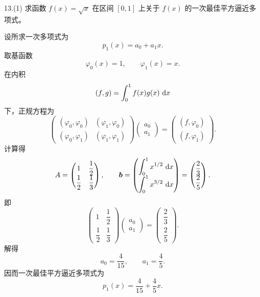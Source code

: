 \documentclass[11pt, a4paper]{ctexart}
\begin{document}
\begin{problem}{13.(1) 求函数 $f(x)=\sqrt{x}$ 在区间 $[0,1]$ 上关于 $f(x)$ 的一次最佳平方逼近多项式。}
\end{problem}

\begin{solution}
    设所求一次多项式为
    \[
        p_1(x)=a_0+a_1x.
    \]
    取基函数
    \[
        \varphi_0(x)=1,\qquad \varphi_1(x)=x.
    \]
    在内积
    \[
        (f,g)=\int_{0}^{1}f(x)g(x)\,\,\mathrm{d} x
    \]
    下，正规方程为
    \[
        \begin{pmatrix}
            (\varphi_0,\varphi_0) & (\varphi_1,\varphi_0) \\
            (\varphi_0,\varphi_1) & (\varphi_1,\varphi_1)
        \end{pmatrix}
        \begin{pmatrix}
            a_0 \\
            a_1
        \end{pmatrix}
        =
        \begin{pmatrix}
            (f,\varphi_0) \\
            (f,\varphi_1)
        \end{pmatrix}.
    \]
    计算得
    \[
        A=
        \begin{pmatrix}
            1 & \dfrac{1}{2} \\
            \dfrac{1}{2} & \dfrac{1}{3}
        \end{pmatrix},
        \qquad
        \bm b=
        \begin{pmatrix}
            \displaystyle\int_{0}^{1}x^{1/2}\,\,\mathrm{d} x \\
            \displaystyle\int_{0}^{1}x^{3/2}\,\,\mathrm{d} x
        \end{pmatrix}
        =
        \begin{pmatrix}
            \dfrac{2}{3} \\
            \dfrac{2}{5}
        \end{pmatrix}.
    \]
    即
    \[
        \begin{pmatrix}
            1 & \dfrac{1}{2} \\
            \dfrac{1}{2} & \dfrac{1}{3}
        \end{pmatrix}
        \begin{pmatrix}
            a_0 \\
            a_1
        \end{pmatrix}
        =
        \begin{pmatrix}
            \dfrac{2}{3} \\
            \dfrac{2}{5}
        \end{pmatrix}.
    \]
    解得
    \[
        a_0=\frac{4}{15},\qquad a_1=\frac{4}{5}.
    \]
    因而一次最佳平方逼近多项式为
    \[
        p_1(x)=\frac{4}{15}+\frac{4}{5}x.
    \]
\end{solution}
\end{document}
